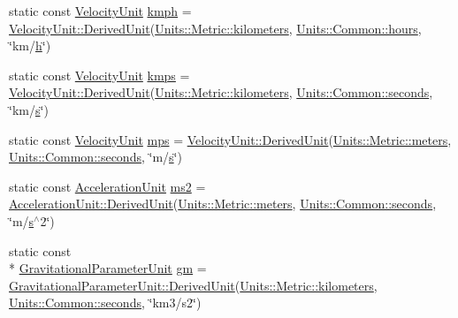 \begin{DoxyCompactItemize}
\item 
static const \hyperlink{_quantity_8h_a4130b5cf107e9890a06c6c06bbfa7da3}{Velocity\+Unit} \hyperlink{class_units_1_1_metric_ae1c8538c908650861579c9ac0b66457d}{kmph} = \hyperlink{class_unit_a62b5aa1a4619ce98223eb728f91cf28d}{Velocity\+Unit\+::\+Derived\+Unit}(\hyperlink{class_units_1_1_metric_a75f22b48abbb71b6fa08adf183565a9a}{Units\+::\+Metric\+::kilometers}, \hyperlink{class_units_1_1_common_a85905b04a8c1fa4058249d06c81828c7}{Units\+::\+Common\+::hours}, \char`\"{}km/\hyperlink{glext_8h_afa0fb1b5e976920c0abeff2dca3ed774}{h}\char`\"{})
\item 
static const \hyperlink{_quantity_8h_a4130b5cf107e9890a06c6c06bbfa7da3}{Velocity\+Unit} \hyperlink{class_units_1_1_metric_ae30e1438d1f93d6d08901e1fe9b31919}{kmps} = \hyperlink{class_unit_a62b5aa1a4619ce98223eb728f91cf28d}{Velocity\+Unit\+::\+Derived\+Unit}(\hyperlink{class_units_1_1_metric_a75f22b48abbb71b6fa08adf183565a9a}{Units\+::\+Metric\+::kilometers}, \hyperlink{class_units_1_1_common_a0cc948d0fded9699abb22295119fff7b}{Units\+::\+Common\+::seconds}, \char`\"{}km/\hyperlink{glext_8h_a4af680a6c683f88ed67b76f207f2e6e4}{s}\char`\"{})
\item 
static const \hyperlink{_quantity_8h_a4130b5cf107e9890a06c6c06bbfa7da3}{Velocity\+Unit} \hyperlink{class_units_1_1_metric_af960d1782d357569275d856dc28ed895}{mps} = \hyperlink{class_unit_a62b5aa1a4619ce98223eb728f91cf28d}{Velocity\+Unit\+::\+Derived\+Unit}(\hyperlink{class_units_1_1_metric_a74b4e02c4b56750866bb289784d964ba}{Units\+::\+Metric\+::meters}, \hyperlink{class_units_1_1_common_a0cc948d0fded9699abb22295119fff7b}{Units\+::\+Common\+::seconds}, \char`\"{}m/\hyperlink{glext_8h_a4af680a6c683f88ed67b76f207f2e6e4}{s}\char`\"{})
\item 
static const \hyperlink{_quantity_8h_aa1729851532d88933ff921f24a0bce3b}{Acceleration\+Unit} \hyperlink{class_units_1_1_metric_a172a4a3ec21992ffee09794cf07f9563}{ms2} = \hyperlink{class_unit_a62b5aa1a4619ce98223eb728f91cf28d}{Acceleration\+Unit\+::\+Derived\+Unit}(\hyperlink{class_units_1_1_metric_a74b4e02c4b56750866bb289784d964ba}{Units\+::\+Metric\+::meters}, \hyperlink{class_units_1_1_common_a0cc948d0fded9699abb22295119fff7b}{Units\+::\+Common\+::seconds}, \char`\"{}m/\hyperlink{glext_8h_a4af680a6c683f88ed67b76f207f2e6e4}{s}$^\wedge$2\char`\"{})
\item 
static const \\*
\hyperlink{_quantity_8h_ac250a56b26235a8dc9d44fbbeabe2024}{Gravitational\+Parameter\+Unit} \hyperlink{class_units_1_1_metric_a8e5b74eb410af1d26aadb0adfb77dc21}{gm} = \hyperlink{class_unit_a62b5aa1a4619ce98223eb728f91cf28d}{Gravitational\+Parameter\+Unit\+::\+Derived\+Unit}(\hyperlink{class_units_1_1_metric_a75f22b48abbb71b6fa08adf183565a9a}{Units\+::\+Metric\+::kilometers}, \hyperlink{class_units_1_1_common_a0cc948d0fded9699abb22295119fff7b}{Units\+::\+Common\+::seconds}, \char`\"{}km3/s2\char`\"{})
\end{DoxyCompactItemize}


